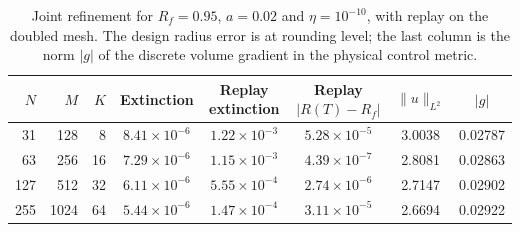 \begin{table}[tbp]
\caption{Joint refinement for $R_f=0.95$, $a=0.02$ and $\eta=10^{-10}$, with replay on the doubled mesh. The design radius error is at rounding level; the last column is the norm $|g|$ of the discrete volume gradient in the physical control metric.}
\label{tab:num_mesh}
\centering\footnotesize\setlength{\tabcolsep}{4pt}
\begin{tabular}{rrrccccc}
\toprule
$N$ & $M$ & $K$ & Extinction & Replay extinction & Replay $|R(T)-R_f|$ & $\|u\|_{L^2}$ & $|g|$\\
\midrule
31 & 128 & 8 & $8.41\times10^{-6}$ & $1.22\times10^{-3}$ & $5.28\times10^{-5}$ & 3.0038 & 0.02787 \\
63 & 256 & 16 & $7.29\times10^{-6}$ & $1.15\times10^{-3}$ & $4.39\times10^{-7}$ & 2.8081 & 0.02863 \\
127 & 512 & 32 & $6.11\times10^{-6}$ & $5.55\times10^{-4}$ & $2.74\times10^{-6}$ & 2.7147 & 0.02902 \\
255 & 1024 & 64 & $5.44\times10^{-6}$ & $1.47\times10^{-4}$ & $3.11\times10^{-5}$ & 2.6694 & 0.02922 \\
\bottomrule
\end{tabular}
\end{table}
